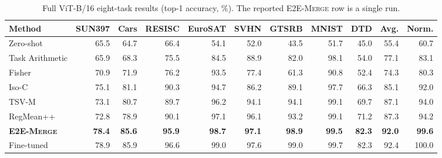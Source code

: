 \documentclass[letterpaper]{article} %
\newcommand{\method}{\textup{\textsc{E2E-Merge}}\xspace}
\theoremstyle{plain}
\theoremstyle{definition}
\begin{document}
\begin{table}[tb]
\centering
{\small
\begin{tabular*}{\textwidth}{@{\extracolsep{\fill}}lrrrrrrrrrr}
\toprule
Method & SUN397 & Cars & RESISC & EuroSAT & SVHN & GTSRB & MNIST & DTD & Avg. & Norm. \\
\midrule
Zero-shot & 65.5 & 64.7 & 66.4 & 54.1 & 52.0 & 43.5 & 51.7 & 45.0 & 55.4 & 60.7 \\
Task Arithmetic & 65.9 & 68.3 & 75.5 & 84.5 & 88.9 & 82.0 & 98.1 & 54.0 & 77.1 & 83.1 \\
Fisher & 70.9 & 71.9 & 76.2 & 93.5 & 77.4 & 61.3 & 90.8 & 52.4 & 74.3 & 80.3 \\
Iso-C & 75.1 & 81.1 & 90.3 & 94.7 & 86.2 & 89.1 & 97.7 & 66.3 & 85.1 & 92.0 \\
TSV-M & 73.1 & 80.7 & 89.7 & 96.2 & 94.1 & 94.1 & 99.1 & 69.7 & 87.1 & 94.0 \\
RegMean++ & 72.8 & 78.9 & 90.1 & 97.1 & 96.1 & 93.2 & 99.1 & 71.2 & 87.3 & 94.2 \\
\textbf{\method} & \textbf{78.4} & \textbf{85.6} & \textbf{95.9} & \textbf{98.7} & \textbf{97.1} & \textbf{98.9} & \textbf{99.5} & \textbf{82.3} & \textbf{92.0} & \textbf{99.6} \\
\midrule
Fine-tuned & 78.9 & 85.9 & 96.6 & 99.0 & 97.6 & 99.0 & 99.7 & 82.3 & 92.4 & 100.0 \\
\bottomrule
\end{tabular*}
}
\caption{Full ViT-B/16 eight-task results (top-1 accuracy, \%). The reported \method
row is a single run.}
\label{tab:b16-full}
\end{table}
\end{document}
